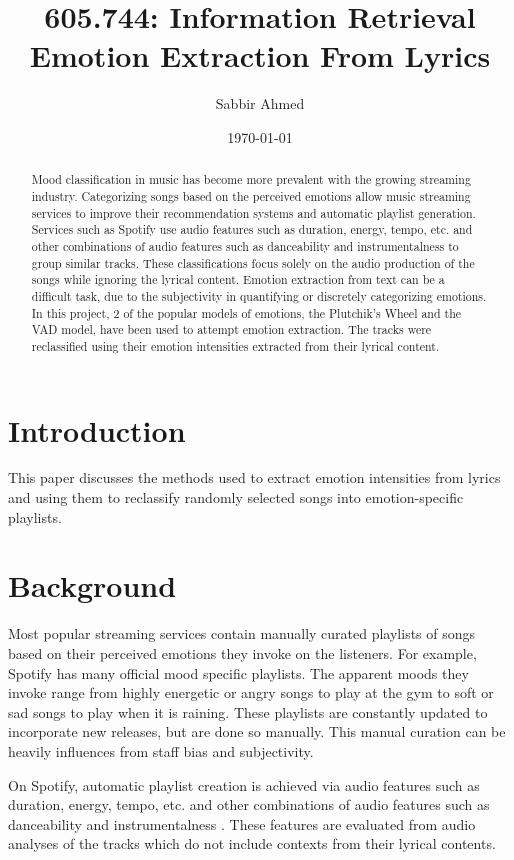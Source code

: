 \documentclass[11pt]{article}
\title{605.744: Information Retrieval \\ Emotion Extraction From Lyrics}
\author{Sabbir Ahmed}
\date{\today}
\begin{document}
\maketitle
\tableofcontents
\clearpage
\newpage

\begin{abstract}
  \noindent Mood classification in music has become more prevalent with the growing streaming industry. Categorizing songs based on the perceived emotions allow music streaming services to improve their recommendation systems and automatic playlist generation. Services such as Spotify use audio features such as duration, energy, tempo, etc. and other combinations of audio features such as danceability and instrumentalness to group similar tracks. These classifications focus solely on the audio production of the songs while ignoring the lyrical content. Emotion extraction from text can be a difficult task, due to the subjectivity in quantifying or discretely categorizing emotions. In this project, 2 of the popular models of emotions, the Plutchik's Wheel and the VAD model, have been used to attempt emotion extraction. The tracks were reclassified using their emotion intensities extracted from their lyrical content.
\end{abstract}

\section{Introduction}
This paper discusses the methods used to extract emotion intensities from lyrics and using them to reclassify randomly selected songs into emotion-specific playlists.

\section{Background}

Most popular streaming services contain manually curated playlists of songs based on their perceived emotions they invoke on the listeners. For example, Spotify has many official mood specific playlists. The apparent moods they invoke range from highly energetic or angry songs to play at the gym to soft or sad songs to play when it is raining. These playlists are constantly updated to incorporate new releases, but are done so manually. This manual curation can be heavily influences from staff bias and subjectivity.

On Spotify, automatic playlist creation is achieved via audio features such as duration, energy, tempo, etc. and other combinations of audio features such as danceability and instrumentalness \cite{spotify}. These features are evaluated from audio analyses of the tracks which do not include contexts from their lyrical contents.
\end{document}
